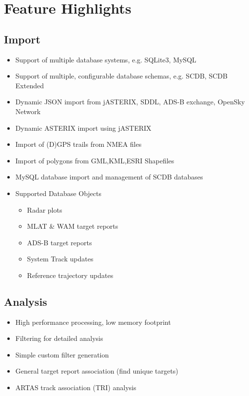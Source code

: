 \section{Feature Highlights}

\subsection{Import}
\begin{itemize}  
    \item Support of multiple database systems, e.g. SQLite3, MySQL
    \item Support of multiple, configurable database schemas, e.g. SCDB, SCDB Extended
    \item Dynamic JSON import from jASTERIX, SDDL, ADS-B exchange, OpenSky Network
    \item Dynamic ASTERIX import using jASTERIX
    \item Import of (D)GPS trails from NMEA files
    \item Import of polygons from GML,KML,ESRI Shapefiles
    \item MySQL database import and management of SCDB databases
    \item Supported Database Objects
    \begin{itemize}  
        \item Radar plots
        \item MLAT \& WAM target reports
        \item ADS-B target reports
        \item System Track updates
        \item Reference trajectory updates
    \end{itemize}
\end{itemize}

\subsection{Analysis}
\begin{itemize}  
    \item High performance processing, low memory footprint
    \item Filtering for detailed analysis
    \item Simple custom filter generation
    \item General target report association (find unique targets)
    \item ARTAS track association (TRI) analysis
\end{itemize}

